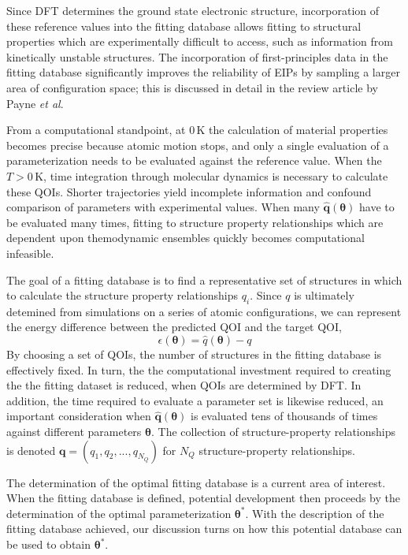 Since DFT determines the ground state electronic structure, incorporation of these reference values into the fitting database allows fitting to structural properties which are experimentally difficult to access, such as information from kinetically unstable structures.  The incorporation of first-principles data in the fitting database significantly improves the reliability of EIPs by sampling a larger area of configuration space; this is discussed in detail in the review article by Payne \emph{et al}.\cite{payne1996_dft_database}

From a computational standpoint, at $0 \,\mathrm{K}$  the calculation of material properties becomes precise because atomic motion stops, and only a single evaluation of a parameterization needs to be evaluated against the reference value.  When the $T>0 \,\mathrm{K}$, time integration through molecular dynamics is necessary to calculate these QOIs.  Shorter trajectories yield incomplete information and confound comparison of parameters with experimental values.  When many $\hat{\bm{q}}(\bm{\theta})$ have to be evaluated many times, fitting to structure property relationships which are dependent upon themodynamic ensembles quickly becomes computational infeasible.

The goal of a fitting database is to find a representative set of structures in which to calculate the structure property relationships $q_i$.  Since $q$ is ultimately detemined from simulations on a series of atomic configurations, we can represent the energy difference between the predicted QOI and the target QOI,
\begin{equation}
	\epsilon(\bm{\theta})=\hat{q}(\bm{\theta})-q
\end{equation}
By choosing a set of QOIs, the number of structures in the fitting database is effectively fixed.  In turn, the the computational investment required to creating the the fitting dataset is reduced, when QOIs are determined by DFT.  In addition, the time required to evaluate a parameter set is likewise reduced, an important consideration when $\hat{\bm{q}}(\bm{\theta})$ is evaluated tens of thousands of times against different parameters $\bm{\theta}$.  The collection of structure-property relationships is denoted $\bm{q}=(q_1,q_2,...,q_{N_Q})$ for $N_Q$ structure-property relationships.

The determination of the optimal fitting database is a current area of interest\cite{zhang2015_bayes_fitttingdb}.  When the fitting database is defined, potential development then proceeds by the determination of the optimal parameterization $\bm{\theta}^*$.  With the description of the fitting database achieved, our discussion turns on how this potential database can be used to obtain $\bm{\theta}^*$.

